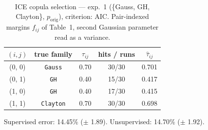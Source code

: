 \begin{table}[htbp]
  \centering
  \caption{ICE copula selection — exp.\ 1 (\{Gauss, GH, Clayton\}, $p_{\text{orig}}$), criterion: AIC. Pair-indexed margins $f_{ij}$ of Table~1, second Gaussian parameter read as a variance.}
  \label{tab:exp3-exp1_orig_p__aic}
  \begin{tabular}{ccccc}
    \toprule
    $(i, j)$ & true family & $\tau_{ij}$ & hits / runs & $\hat\tau_{ij}$ \\
    \midrule
    (0, 0) & \texttt{Gauss} & 0.70 & 30/30 & 0.701 \\
    (0, 1) & \texttt{GH} & 0.40 & 15/30 & 0.417 \\
    (1, 0) & \texttt{GH} & 0.40 & 17/30 & 0.415 \\
    (1, 1) & \texttt{Clayton} & 0.70 & 30/30 & 0.698 \\
    \bottomrule
  \end{tabular}
  \par\smallskip Supervised error: 14.45\% ($\pm$ 1.89). Unsupervised: 14.70\% ($\pm$ 1.92).
\end{table}
